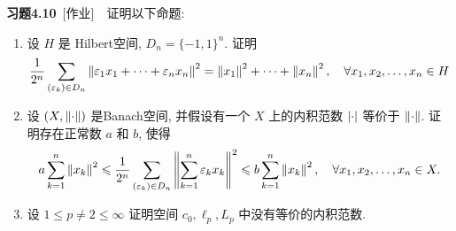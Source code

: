     \textbf{习题4.10}\ [作业]\ \ 证明以下命题:
    \begin{enumerate}[(1)]
        \item 设 $ H $ 是 Hilbert空间, $ D_{n}=\{ -1, 1 \}^{n} $. 证明
        \[
            \frac{1}{2^{n}}\sum_{(\varepsilon_{k})\in D_{n}}\left\| \varepsilon_{1}x_{1}+\cdots+\varepsilon_{n}x_{n} \right\|^{2}=\left\| x_{1} \right\|^{2}+\cdots+\left\| x_{n} \right\|^{2}, \quad \forall x_{1}, x_{2}, \dots, x_{n}\in H
        \]
          \item 设 $ (X, \left\| \cdot \right\|) $ 是Banach空间, 并假设有一个 $ X $ 上的内积范数 $ \left| \cdot \right|  $ 等价于 $ \left\| \cdot \right\| $. 证明存在正常数 $ a $ 和 $ b $, 使得
          \[
            a\sum_{k=1}^{n}\left\| x_{k} \right\|^{2}\leqslant\frac{1}{2^{n}}\sum_{(\varepsilon_{k})\in D_{n}}\left\| \sum_{k=1}^{n}\varepsilon_{k}x_{k} \right\|^{2}\leqslant b\sum_{k=1}^{n}\left\| x_{k} \right\|^{2}, \quad \forall x_{1}, x_{2}, \dots, x_{n} \in X.
        \]
        \item 设 $ 1\leqslant p\ne2\leqslant\infty $ 证明空间 $ c_{0}, \ell_{p}, L_{p} $ 中没有等价的内积范数.
    \end{enumerate}
